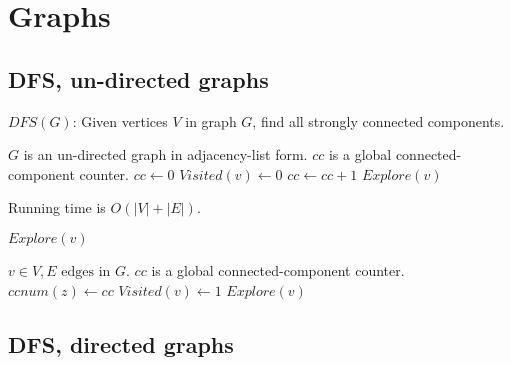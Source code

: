 \documentclass{article}
\begin{document}
	
\listofalgorithms
\section{Graphs}
\subsection{DFS, un-directed graphs}

\begin{algorithm}
\label{alg:dfs_und}
\caption{$DFS(G)$: Given vertices $V$ in graph $G$, find all strongly connected components.}
\begin{algorithmic}[1]
\REQUIRE $G$ is an un-directed graph in adjacency-list form.
\REQUIRE $cc$ is a global connected-component counter.
\STATE $cc \gets 0$
\STATE $Visited(v) \gets 0$
\ENDFOR
{}
	\STATE $cc \gets cc + 1$
	\STATE $Explore(v)$
\ENDIF
\ENDFOR
\end{algorithmic}
 Running time is $O(|V|+|E|)$.
\end{algorithm}

\begin{algorithm}
\caption{$Explore(v)$}
\begin{algorithmic}[1]
\REQUIRE $v \in V, E \text{ edges in } G$.
\REQUIRE $cc$ is a global connected-component counter.
\STATE $ccnum(z) \gets cc$  
\STATE $Visited(v) \gets 1$
	\STATE $Explore(v)$
\ENDIF
\ENDFOR
\end{algorithmic}
\end{algorithm}

\subsection{DFS, directed graphs}
\end{document}
